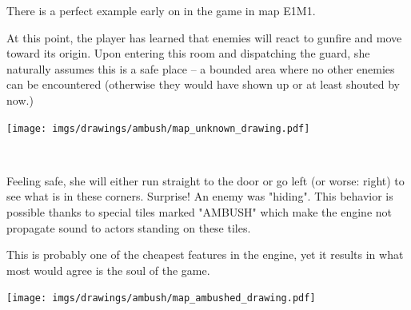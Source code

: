 \par
\begin{minipage}{1\textwidth}
\begin{figure}[H]
 \centering
\end{figure}
\par


  \begin{minipage}{0.6\textwidth}
  There is a perfect example early on in the game in map E1M1.\\
  \par At this point, the player has learned that enemies will react to gunfire and move toward its origin. Upon entering this room and dispatching the guard, she naturally assumes this is a safe place -- a bounded area where no other enemies can be encountered (otherwise they would have shown up or at least shouted by now.)
  \end{minipage}
  \begin{minipage}{0.4\textwidth}
  \begin{flushright}
  \texttt{[image: imgs/drawings/ambush/map\_unknown\_drawing.pdf]}
  \end{flushright}  
  \end{minipage}
\end{minipage}
\noindent
\\


\par
\begin{minipage}{1\textwidth}
  \begin{figure}[H]
   \centering
  \end{figure}
  \par
  \begin{minipage}{0.6\textwidth}
  Feeling safe, she will either run straight to the door or go left (or worse: right) to see what is in these corners. Surprise! An enemy was "hiding". This behavior is possible thanks to special tiles marked "AMBUSH" which make the engine not propagate sound to actors standing on these tiles.\\
  \par
   This is probably one of the cheapest features in the engine, yet it results in what most would agree is the soul of the game.
  \end{minipage}
  \begin{minipage}{0.4\textwidth}
  \begin{flushright}
  \texttt{[image: imgs/drawings/ambush/map\_ambushed\_drawing.pdf]}
  \end{flushright}
  \end{minipage}
\end{minipage}
\noindent
\\


